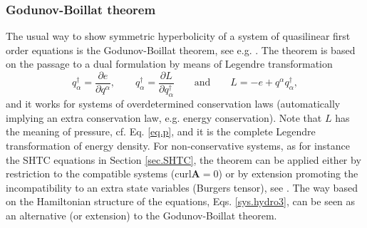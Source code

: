\documentclass[
10pt, %
a4paper, %
oneside, %
headinclude,footinclude, %
BCOR5mm, %
]{scrartcl}
\renewcommand{\AA}{\mathbf{A}}
\newcommand{\curl}{\mathrm{curl}}
\begin{document}
\subsubsection{Godunov-Boillat theorem}
The usual way to show symmetric hyperbolicity of a system of quasilinear first order equations is the Godunov-Boillat theorem, see e.g. \cite{SHTC-GENERIC}. The theorem is based on the passage to a dual formulation by means of Legendre transformation 
\begin{equation}
q^\dagger_\alpha = \frac{\partial e}{\partial q^\alpha}, \qquad q^\dagger_\alpha = \frac{\partial L}{\partial q^\dagger_\alpha}
\qquad\mbox{and}\qquad L = -e + q^\alpha q^\dagger_\alpha,
\end{equation}
and it works for systems of overdetermined conservation laws (automatically implying an extra 
conservation law, e.g. energy conservation). Note that $L$ has the meaning of pressure, cf. Eq. \eqref{eq.p}, and it is the complete Legendre transformation of energy density. For non-conservative systems, as for instance the SHTC 
equations in Section \ref{sec.SHTC}, the theorem can be applied either by restriction to the 
compatible systems ($\curl \AA = 
0$) or by extension promoting the incompatibility to an extra state variables (Burgers tensor), see 
\cite{SHTC-GENERIC}. The way based on the Hamiltonian structure of the equations, Eqs. 
\eqref{sys.hydro3}, can be seen as an alternative (or extension) to the Godunov-Boillat theorem.
\end{document}
